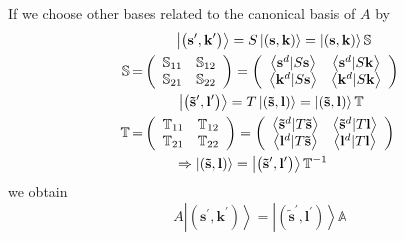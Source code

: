 \documentclass[aps,preprint]{revtex4}%
\begin{document}
If we choose other bases related to the canonical basis of $A$ by
\begin{align}
& \qquad\quad\left|  \left(  \mathbf{s}^{\prime}\mathbf{,k}^{\prime}\right)
\right\rangle =S\left|  \left(  \mathbf{s,k}\right)  \right\rangle =\left|
\left(  \mathbf{s,k}\right)  \right\rangle \mathbb{S}\nonumber\\
\mathbb{S\,}  & \mathbb{=}\left(
\begin{array}
[c]{cc}%
\mathbb{S}_{11} & \mathbb{S}_{12}\\
\mathbb{S}_{21} & \mathbb{S}_{22}%
\end{array}
\right)  =\left(
\begin{array}
[c]{cc}%
\left\langle \mathbf{s}^{d}|S\mathbf{s}\right\rangle  & \left\langle
\mathbf{s}^{d}|S\mathbf{k}\right\rangle \\
\left\langle \mathbf{k}^{d}|S\mathbf{s}\right\rangle  & \left\langle
\mathbf{k}^{d}|S\mathbf{k}\right\rangle
\end{array}
\right) \nonumber\\
& \qquad\quad\,\left|  \left(  \mathbf{\tilde{s}}^{\prime}\mathbf{,l}^{\prime
}\right)  \right\rangle =T\left|  \left(  \mathbf{\tilde{s},l}\right)
\right\rangle =\left|  \left(  \mathbf{\tilde{s},l}\right)  \right\rangle
\mathbb{T}\nonumber\\
\mathbb{T}\mathbb{\,}  & \mathbb{=}\left(
\begin{array}
[c]{cc}%
\mathbb{T}_{11} & \mathbb{T}_{12}\\
\mathbb{T}_{21} & \mathbb{T}_{22}%
\end{array}
\right)  =\left(
\begin{array}
[c]{cc}%
\left\langle \mathbf{\tilde{s}}^{d}|T\mathbf{\tilde{s}}\right\rangle  &
\left\langle \mathbf{\tilde{s}}^{d}|T\mathbf{l}\right\rangle \\
\left\langle \mathbf{l}^{d}|T\mathbf{\tilde{s}}\right\rangle  & \left\langle
\mathbf{l}^{d}|T\mathbf{l}\right\rangle
\end{array}
\right) \nonumber\\
& \qquad\quad\Rightarrow\left|  \left(  \mathbf{\tilde{s},l}\right)
\right\rangle =\left|  \left(  \mathbf{\tilde{s}}^{\prime}\mathbf{,l}^{\prime
}\right)  \right\rangle \mathbb{T}^{-1}%
\end{align}
we obtain%
\begin{equation}
A\left|  \left(  \mathbf{s}^{\prime}\mathbf{,k}^{\prime}\right)  \right\rangle
=\left|  \left(  \mathbf{\tilde{s}}^{\prime}\mathbf{,l}^{\prime}\right)
\right\rangle \mathbb{A}%
\end{equation}
\end{document}
